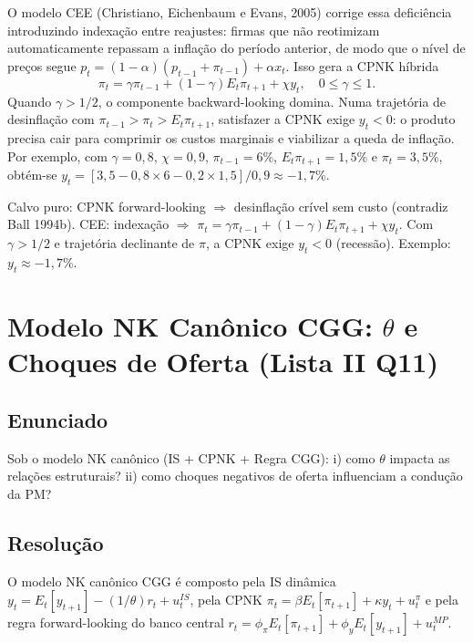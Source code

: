 \documentclass[12pt, a4paper]{article}
\begin{document}
O modelo CEE (Christiano, Eichenbaum e Evans, 2005) corrige essa deficiência introduzindo indexação entre reajustes: firmas que não reotimizam automaticamente repassam a inflação do período anterior, de modo que o nível de preços segue $p_t = (1-\alpha)(p_{t-1} + \pi_{t-1}) + \alpha x_t$. Isso gera a CPNK híbrida
\[
\pi_t = \gamma\pi_{t-1} + (1-\gamma)E_t\pi_{t+1} + \chi y_t, \quad 0\leq\gamma\leq 1.
\]
Quando $\gamma > 1/2$, o componente backward-looking domina. Numa trajetória de desinflação com $\pi_{t-1} > \pi_t > E_t\pi_{t+1}$, satisfazer a CPNK exige $y_t < 0$: o produto precisa cair para comprimir os custos marginais e viabilizar a queda de inflação. Por exemplo, com $\gamma=0{,}8$, $\chi=0{,}9$, $\pi_{t-1}=6\%$, $E_t\pi_{t+1}=1{,}5\%$ e $\pi_t=3{,}5\%$, obtém-se $y_t = [3{,}5 - 0{,}8\times 6 - 0{,}2\times 1{,}5]/0{,}9 \approx -1{,}7\%$.

\begin{resultbox}[title={Custo de Desinflação no CEE (Lista II Q10)}]
Calvo puro: CPNK forward-looking $\Rightarrow$ desinflação crível sem custo (contradiz Ball 1994b). CEE: indexação $\Rightarrow$ $\pi_t = \gamma\pi_{t-1} + (1-\gamma)E_t\pi_{t+1} + \chi y_t$. Com $\gamma > 1/2$ e trajetória declinante de $\pi$, a CPNK exige $y_t < 0$ (recessão). Exemplo: $y_t \approx -1{,}7\%$.
\end{resultbox}

\section{Modelo NK Canônico CGG: $\theta$ e Choques de Oferta (Lista II Q11)}

\subsection*{Enunciado}
Sob o modelo NK canônico (IS + CPNK + Regra CGG): i) como $\theta$ impacta as relações estruturais? ii) como choques negativos de oferta influenciam a condução da PM?

\subsection*{Resolução}

O modelo NK canônico CGG é composto pela IS dinâmica $y_t = E_t[y_{t+1}] - (1/\theta)r_t + u_t^{IS}$, pela CPNK $\pi_t = \beta E_t[\pi_{t+1}] + \kappa y_t + u_t^\pi$ e pela regra forward-looking do banco central $r_t = \phi_\pi E_t[\pi_{t+1}] + \phi_y E_t[y_{t+1}] + u_t^{MP}$.
\end{document}
